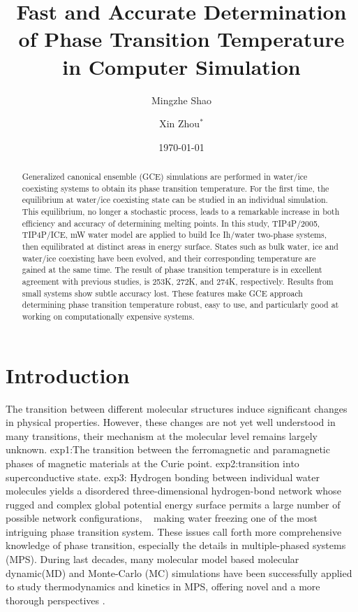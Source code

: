 \documentclass[aps,prl,twocolumn,superscriptaddress]{revtex4-1}
\begin{document}
\title{Fast and Accurate Determination of Phase Transition Temperature in Computer Simulation}

\author{Mingzhe Shao}

\author{Xin Zhou$^{*}$}

\date{\today}
 

\begin{abstract}  
Generalized canonical ensemble (GCE) simulations are performed in water/ice coexisting systems to obtain its phase transition temperature. For the first time, the equilibrium at water/ice coexisting state can be studied in an individual simulation. This equilibrium, no longer a stochastic process, leads to a remarkable increase in both efficiency and accuracy of determining melting points. In this study, TIP4P/2005, TIP4P/ICE, mW water model are applied to build Ice Ih/water two-phase systems, then equilibrated at distinct areas in energy surface. States such as bulk water, ice and water/ice coexisting have been evolved, and their corresponding temperature are gained at the same time. The result of phase transition temperature is in excellent agreement with previous studies, is 253K, 272K, and 274K, respectively. Results from small systems show subtle accuracy lost.  These features make GCE approach determining phase transition temperature robust, easy to use, and particularly good at working on computationally expensive systems.
\end{abstract}

\pacs{ } 

\maketitle{}
\section{Introduction}

The transition between different molecular structures induce significant changes in physical properties.  However, these changes are not yet well understood in many transitions, their mechanism at the molecular level remains largely unknown.
exp1:The transition between the ferromagnetic and paramagnetic phases of magnetic materials at the Curie point.
exp2:transition into superconductive state.
exp3: Hydrogen bonding between individual water molecules yields a disordered three-dimensional hydrogen-bond network whose rugged and complex global potential energy surface permits a large number of possible network configurations, ~\cite{Matsumoto2002} making water freezing one of the most intriguing phase transition system. 
These issues call forth more comprehensive knowledge of phase transition, especially the details in multiple-phased systems (MPS). During last decades, many molecular model based molecular dynamic(MD) and Monte-Carlo (MC) simulations have been successfully applied to study thermodynamics and kinetics in MPS, offering novel and a more thorough perspectives\cite{Conde2017,Gao2000,Molinero2009,Moore2011,Sanz2004a,Sanz2004,Smit1992} . 
\end{document}
